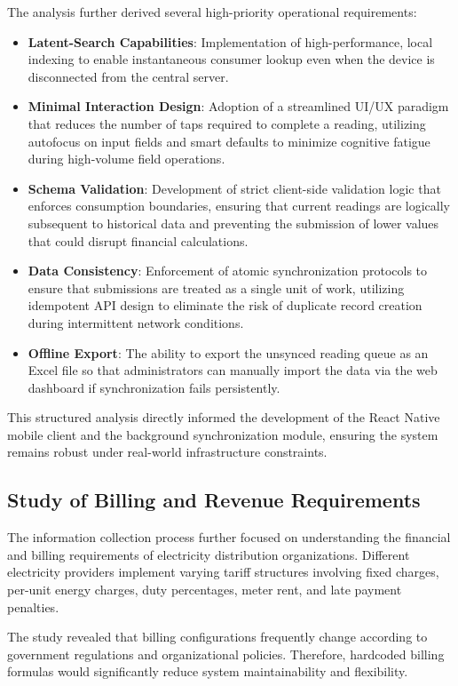 \documentclass[12pt, a4paper, onecolumn]{report}
\begin{document}
The analysis further derived several high-priority operational requirements:
\begin{itemize}
    \item \textbf{Latent-Search Capabilities}: Implementation of high-performance, local indexing to enable instantaneous consumer lookup even when the device is disconnected from the central server.
    \item \textbf{Minimal Interaction Design}: Adoption of a streamlined UI/UX paradigm that reduces the number of taps required to complete a reading, utilizing autofocus on input fields and smart defaults to minimize cognitive fatigue during high-volume field operations.
    \item \textbf{Schema Validation}: Development of strict client-side validation logic that enforces consumption boundaries, ensuring that current readings are logically subsequent to historical data and preventing the submission of lower values that could disrupt financial calculations.
    \item \textbf{Data Consistency}: Enforcement of atomic synchronization protocols to ensure that submissions are treated as a single unit of work, utilizing idempotent API design to eliminate the risk of duplicate record creation during intermittent network conditions.
    \item \textbf{Offline Export}: The ability to export the unsynced reading queue as an Excel file so that administrators can manually import the data via the web dashboard if synchronization fails persistently.
\end{itemize}

This structured analysis directly informed the development of the React Native mobile client and the background synchronization module, ensuring the system remains robust under real-world infrastructure constraints.


\subsection{Study of Billing and Revenue Requirements}

The information collection process further focused on understanding the financial and billing requirements of electricity distribution organizations. Different electricity providers implement varying tariff structures involving fixed charges, per-unit energy charges, duty percentages, meter rent, and late payment penalties.

The study revealed that billing configurations frequently change according to government regulations and organizational policies. Therefore, hardcoded billing formulas would significantly reduce system maintainability and flexibility.
\end{document}
